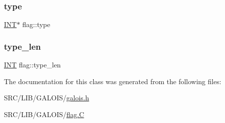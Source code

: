 \mbox{\label{classflag_a704364aedcf79da39e9a41391602fd92}} 
\subsubsection{\texorpdfstring{type}{type}}
{\footnotesize\ttfamily \mbox{\hyperlink{galois_8h_a09fddde158a3a20bd2dcadb609de11dc}{I\+NT}}$\ast$ flag\+::type}

\mbox{\label{classflag_a5c21f6e2775ed149670dc0ceacf3df7f}} 
\subsubsection{\texorpdfstring{type\+\_\+len}{type\_len}}
{\footnotesize\ttfamily \mbox{\hyperlink{galois_8h_a09fddde158a3a20bd2dcadb609de11dc}{I\+NT}} flag\+::type\+\_\+len}



The documentation for this class was generated from the following files\+:\begin{DoxyCompactItemize}
\item 
S\+R\+C/\+L\+I\+B/\+G\+A\+L\+O\+I\+S/\mbox{\hyperlink{galois_8h}{galois.\+h}}\item 
S\+R\+C/\+L\+I\+B/\+G\+A\+L\+O\+I\+S/\mbox{\hyperlink{flag_8_c}{flag.\+C}}\end{DoxyCompactItemize}
